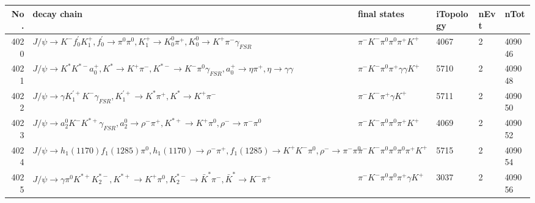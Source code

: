 \begin{table}[htbp] 
\begin{center}
\begin{small}
\begin{tabular}{rlllll}\hline\hline
 No. & decay chain & final states &  iTopology & nEvt & nTot \\\hline
4020&$J/\psi       \rightarrow K^{-}          f^{'}_{0}     K_1^{+}        , f^{'}_{0}      \rightarrow \pi^{0}        \pi^{0}        , K_1^{+}         \rightarrow K_0^{0}        \pi^{+}        , K_0^{0}         \rightarrow K^{+}          \pi^{-}        \gamma_{FSR} $&$\pi^{-}        K^{-}          \pi^{0}        \pi^{0}        \pi^{+}        K^{+}          $& 4067&    2&409046\\
4021&$J/\psi       \rightarrow K^{*}          K^{*-}         a_{0}^{+}      , K^{*}           \rightarrow K^{+}          \pi^{-}        , K^{*-}          \rightarrow K^{-}          \pi^{0}        \gamma_{FSR} , a_{0}^{+}       \rightarrow \eta          \pi^{+}        , \eta           \rightarrow \gamma       \gamma       $&$\pi^{-}        K^{-}          \pi^{0}        \pi^{+}        \gamma       \gamma       K^{+}          $& 5710&    2&409048\\
4022&$J/\psi       \rightarrow \gamma       K_1^{'+}      K^{-}          \gamma_{FSR} , K_1^{'+}       \rightarrow K^{*}          \pi^{+}        , K^{*}           \rightarrow K^{+}          \pi^{-}        $&$\pi^{-}        K^{-}          \pi^{+}        \gamma       K^{+}          $& 5711&    2&409050\\
4023&$J/\psi       \rightarrow a_{2}^{0}      K^{-}          K^{*+}         \gamma_{FSR} , a_{2}^{0}       \rightarrow \rho^{-}      \pi^{+}        , K^{*+}          \rightarrow K^{+}          \pi^{0}        , \rho^{-}       \rightarrow \pi^{-}        \pi^{0}        $&$\pi^{-}        K^{-}          \pi^{0}        \pi^{0}        \pi^{+}        K^{+}          $& 4069&    2&409052\\
4024&$J/\psi       \rightarrow h_{1}(1170)    f_{1}(1285)    \pi^{0}        , h_{1}(1170)     \rightarrow \rho^{-}      \pi^{+}        , f_{1}(1285)     \rightarrow K^{+}          K^{-}          \pi^{0}        , \rho^{-}       \rightarrow \pi^{-}        \pi^{0}        $&$\pi^{-}        K^{-}          \pi^{0}        \pi^{0}        \pi^{0}        \pi^{+}        K^{+}          $& 5715&    2&409054\\
4025&$J/\psi       \rightarrow \gamma       \pi^{0}        K^{*+}         K_2^{*-}       , K^{*+}          \rightarrow K^{+}          \pi^{0}        , K_2^{*-}        \rightarrow \bar{K}^{*}   \pi^{-}        , \bar{K}^{*}    \rightarrow K^{-}          \pi^{+}        $&$\pi^{-}        K^{-}          \pi^{0}        \pi^{0}        \pi^{+}        \gamma       K^{+}          $& 3037&    2&409056\\

\end{tabular}
\end{small}
\end{center}
\end{table}
